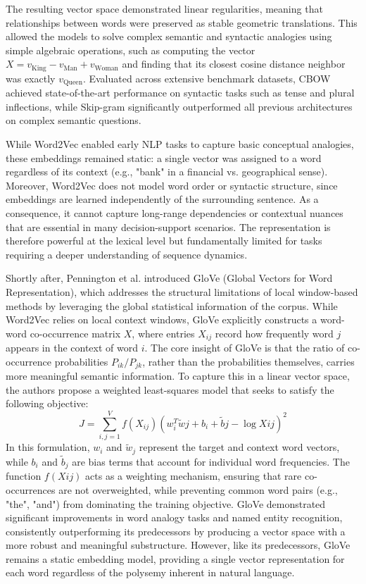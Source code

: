 The resulting vector space demonstrated linear regularities, meaning that relationships between words were preserved as stable geometric translations. This allowed the models to solve complex semantic and syntactic analogies using simple algebraic operations, such as computing the vector $X = v_{\text{King}} - v_{\text{Man}} + v_{\text{Woman}}$ and finding that its closest cosine distance neighbor was exactly $v_{\text{Queen}}$. Evaluated across extensive benchmark datasets, CBOW achieved state-of-the-art performance on syntactic tasks such as tense and plural inflections, while Skip-gram significantly outperformed all previous architectures on complex semantic questions.

While Word2Vec enabled early NLP tasks to capture basic conceptual analogies, these embeddings remained static: a single vector was assigned to a word regardless of its context (e.g., "bank" in a financial vs. geographical sense). Moreover, Word2Vec does not model word order or syntactic structure, since embeddings are learned independently of the surrounding sentence. As a consequence, it cannot capture long-range dependencies or contextual nuances that are essential in many decision-support scenarios. The representation is therefore powerful at the lexical level but fundamentally limited for tasks requiring a deeper understanding of sequence dynamics.




Shortly after, Pennington et al. \cite{pennington2014glove} introduced GloVe (Global Vectors for Word Representation), which addresses the structural limitations of local window-based methods by leveraging the global statistical information of the corpus. While Word2Vec relies on local context windows, GloVe explicitly constructs a word-word co-occurrence matrix $X$, where entries $X_{ij}$ record how frequently word $j$ appears in the context of word $i$. The core insight of GloVe is that the ratio of co-occurrence probabilities $P_{ik}/P_{jk}$, rather than the probabilities themselves, carries more meaningful semantic information. To capture this in a linear vector space, the authors propose a weighted least-squares model that seeks to satisfy the following objective:
\begin{equation}
    J = \sum_{i,j=1}^{V} f(X_{ij}) \left( w_i^T \tilde{w}j + b_i + \tilde{b}j - \log X{ij} \right)^2
\end{equation}
In this formulation, $w_i$ and $\tilde{w}_j$ represent the target and context word vectors, while $b_i$ and $\tilde{b}_j$ are bias terms that account for individual word frequencies. The function $f(X{ij})$ acts as a weighting mechanism, ensuring that rare co-occurrences are not overweighted, while preventing common word pairs (e.g., "the", "and") from dominating the training objective. GloVe demonstrated significant improvements in word analogy tasks and named entity recognition, consistently outperforming its predecessors by producing a vector space with a more robust and meaningful substructure. However, like its predecessors, GloVe remains a static embedding model, providing a single vector representation for each word regardless of the polysemy inherent in natural language.






